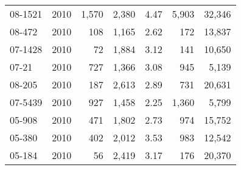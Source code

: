 \begin{tabular}{l|r|r|r|r|r|r}
08-1521   & 2010 & 1,570 &  2,380 &  4.47 & 5,903 &   32,346 \\
08-472    & 2010 &   108 &  1,165 &  2.62 &   172 &   13,837 \\
07-1428   & 2010 &    72 &  1,884 &  3.12 &   141 &   10,650 \\
07-21     & 2010 &   727 &  1,366 &  3.08 &   945 &    5,139 \\
08-205    & 2010 &   187 &  2,613 &  2.89 &   731 &   20,631 \\
07-5439  & 2010 &   927 &  1,458 &  2.25 & 1,360 &    5,799 \\
05-908    & 2010 &   471 &  1,802 &  2.73 &   974 &   15,752 \\
05-380    & 2010 &   402 &  2,012 &  3.53 &   983 &   12,542 \\
05-184    & 2010 &    56 &  2,419 &  3.17 &   176 &   20,370 \\ \hline
\end{tabular}
